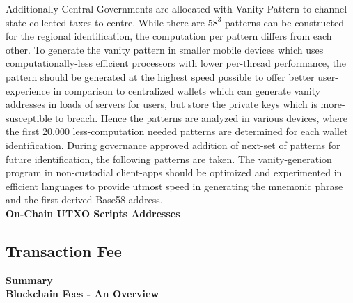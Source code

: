 \documentclass[letterpaper,11pt]{article}
\begin{document}
Additionally Central Governments are allocated with Vanity Pattern to channel state collected taxes to centre. While there are $58^3$ patterns can be constructed for the regional identification, the computation per pattern differs from each other. To generate the vanity pattern in smaller mobile devices which uses computationally-less efficient processors with lower per-thread performance, the pattern should be generated at the highest speed possible to offer better user-experience in comparison to centralized wallets which can generate vanity addresses in loads of servers for users, but store the private keys which is more-susceptible to breach. Hence the patterns are analyzed in various devices, where the first 20,000 less-computation needed patterns are determined for each wallet identification. During governance approved addition of next-set of patterns for future identification, the following patterns are taken. The vanity-generation program in non-custodial client-apps should be optimized and experimented in efficient languages to provide utmost speed in generating the mnemonic phrase and the first-derived Base58 address.\\

\textbf{On-Chain UTXO Scripts Addresses}\\


\subsection{Transaction Fee}

\textbf{Summary}\\




\textbf{Blockchain Fees - An Overview}\\
\end{document}
